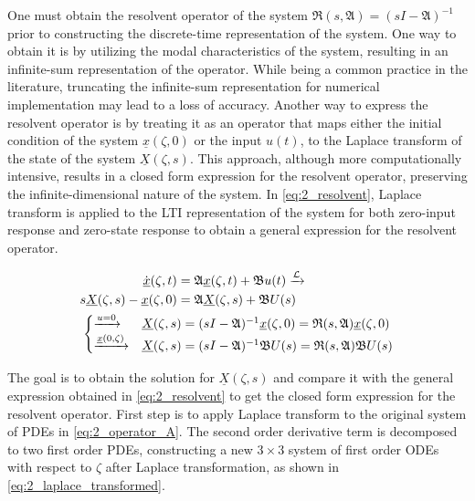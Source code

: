 One must obtain the resolvent operator of the system $\mathfrak{R}(s, \mathfrak{A}) = (sI-\mathfrak{A})^{-1}$ prior to constructing the discrete-time representation of the system. One way to obtain it is by utilizing the modal characteristics of the system, resulting in an infinite-sum representation of the operator. While being a common practice in the literature, truncating the infinite-sum representation for numerical implementation may lead to a loss of accuracy. Another way to express the resolvent operator is by treating it as an operator that maps either the initial condition of the system $\underline{x}(\zeta,0)$ or the input $u(t)$, to the Laplace transform of the state of the system $\underline{X}(\zeta, s)$. This approach, although more computationally intensive, results in a closed form expression for the resolvent operator, preserving the infinite-dimensional nature of the system. In \eqref{eq:2_resolvent}, Laplace transform is applied to the LTI representation of the system for both zero-input response and zero-state response to obtain a general expression for the resolvent operator.

\begin{equation} \label{eq:2_resolvent}
    \begin{aligned}
        \dot{\underline{x}}(\zeta, t) &= \mathfrak{A} \underline{x}(\zeta, t) + \mathfrak{B} u(t) \xrightarrow{\mathcal{L}}\\
        s \underline{X}(\zeta,s) - \underline{x}(\zeta,0) &= \mathfrak{A} \underline{X}(\zeta,s) + \mathfrak{B} U(s)\\
        &\hspace{-7.5em}\begin{cases}
            \xrightarrow{u = 0} &\underline{X}(\zeta,s) = (sI - \mathfrak{A})^{-1} \underline{x}(\zeta,0) = \mathfrak{R}(s, \mathfrak{A}) \underline{x}(\zeta,0)\\
            \xrightarrow{\underline{x}(0, \zeta)}& \underline{X}(\zeta,s) = (sI - \mathfrak{A})^{-1} \mathfrak{B} U(s) = \mathfrak{R}(s, \mathfrak{A}) \mathfrak{B} U(s)
        \end{cases}
    \end{aligned}
    \end{equation}
    
    The goal is to obtain the solution for $\underline{X}(\zeta, s)$ and compare it with the general expression obtained in \eqref{eq:2_resolvent} to get the closed form expression for the resolvent operator. First step is to apply Laplace transform to the original system of PDEs in \eqref{eq:2_operator_A}. The second order derivative term is decomposed to two first order PDEs, constructing a new $3 \times 3$ system of first order ODEs with respect to $\zeta$ after Laplace transformation, as shown in \eqref{eq:2_laplace_transformed}.
    
